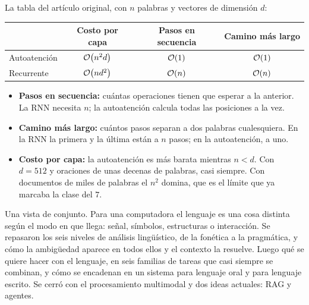 \documentclass[11pt,letterpaper]{article}
\begin{document}
La tabla del artículo original, con $n$ palabras y vectores de
dimensión $d$:

\begin{center}
\begin{tabular}{lccc}
    \toprule
    & \textbf{Costo por capa} & \textbf{Pasos en secuencia}
    & \textbf{Camino más largo} \\
    \midrule
    Autoatención & $\mathcal{O}\!\left(n^2 d\right)$ & $\mathcal{O}\!\left(1\right)$ & $\mathcal{O}\!\left(1\right)$ \\
    Recurrente   & $\mathcal{O}\!\left(n d^2\right)$ & $\mathcal{O}\!\left(n\right)$ & $\mathcal{O}\!\left(n\right)$ \\
    \bottomrule
\end{tabular}
\end{center}

\begin{itemize}[itemsep=0.3em]
    \item \textbf{Pasos en secuencia:} cuántas operaciones tienen que
          esperar a la anterior. La RNN necesita $n$; la autoatención
          calcula todas las posiciones a la vez.
    \item \textbf{Camino más largo:} cuántos pasos separan a dos
          palabras cualesquiera. En la RNN la primera y la última
          están a $n$ pasos; en la autoatención, a uno.
    \item \textbf{Costo por capa:} la autoatención es más barata
          mientras $n < d$. Con $d = 512$ y oraciones de unas decenas
          de palabras, casi siempre. Con documentos de miles de
          palabras el $n^2$ domina, que es el límite que ya marcaba la
          clase del $7$.
\end{itemize}


\newpage


\begin{quick_sum}
    Una vista de conjunto. Para una computadora el lenguaje es una
    cosa distinta según el modo en que llega: señal, símbolos,
    estructuras o interacción. Se repasaron los seis niveles de
    análisis lingüístico, de la fonética a la pragmática, y cómo la
    ambigüedad aparece en todos ellos y el contexto la resuelve. Luego
    qué se quiere hacer con el lenguaje, en seis familias de tareas
    que casi siempre se combinan, y cómo se encadenan en un sistema
    para lenguaje oral y para lenguaje escrito. Se cerró con el
    procesamiento multimodal y dos ideas actuales: RAG y agentes.
\end{quick_sum}
\end{document}
